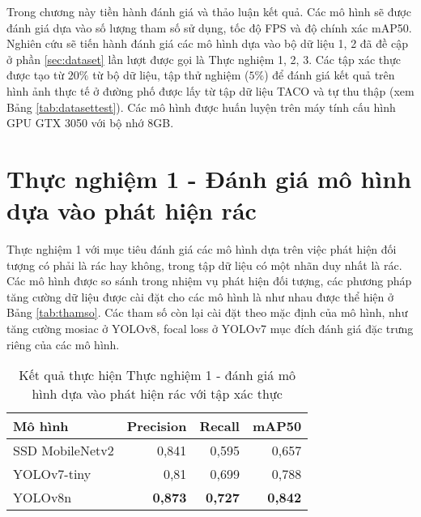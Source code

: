 \documentclass[../the.tex]{subfiles}
\begin{document}
{\fontsize{13}{12} \selectfont
Trong chương này tiền hành đánh giá và thảo luận kết quả. Các mô hình sẽ được đánh giá dựa vào số lượng tham số sử dụng, tốc độ FPS và độ chính xác mAP50.
Nghiên cứu sẽ tiến hành đánh giá các mô hình dựa vào bộ dữ liệu 1, 2 đã đề cập ở phần \ref{sec:dataset} lần lượt được gọi là Thực nghiệm 1, 2, 3.
Các tập xác thực được tạo từ $20\%$ từ bộ dữ liệu, tập thử nghiệm ($5\%$) để đánh giá kết quả trên hình ảnh thực tế ở đường phố được lấy từ tập dữ liệu TACO và tự thu thập (xem Bảng \ref{tab:datasettest}).
Các mô hình được huấn luyện trên máy tính cấu hình GPU GTX 3050 với bộ nhớ 8GB.

}

\section{Thực nghiệm 1 - Đánh giá mô hình dựa vào phát hiện rác}

{\fontsize{13}{12} \selectfont

Thực nghiệm 1 với mục tiêu đánh giá các mô hình dựa trên việc phát hiện đối tượng có phải là rác hay không, trong tập dữ liệu có một nhãn duy nhất là rác.
Các mô hình được so sánh trong nhiệm vụ phát hiện đối tượng, các phương pháp tăng cường dữ liệu được cài đặt cho các mô hình là như nhau được thể hiện ở Bảng \ref{tab:thamso}.
Các tham số còn lại cài đặt theo mặc định của mô hình, như tăng cường mosiac ở YOLOv8, focal loss ở YOLOv7 mục đích đánh giá đặc trưng riêng của các mô hình.

}
\begin{table}[h!]
    \centering
    \caption{Kết quả thực hiện Thực nghiệm 1 - đánh giá mô hình dựa vào phát hiện rác với tập xác thực}
    \begin{tabular}{|l|r|r|r|}
        \hline
        \textbf{Mô hình}  & \textbf{Precision} & \textbf{Recall} & \textbf{mAP50} \\ \hline
        SSD   MobileNetv2 & 0,841              & 0,595           & 0,657          \\ \hline
        YOLOv7-tiny       & 0,81               & 0,699           & 0,788          \\ \hline
        YOLOv8n           & \textbf{0,873}     & \textbf{0,727}  & \textbf{0,842} \\ \hline
    \end{tabular}
    \label{tab:thucnghiem1.1}
\end{table}
\end{document}
